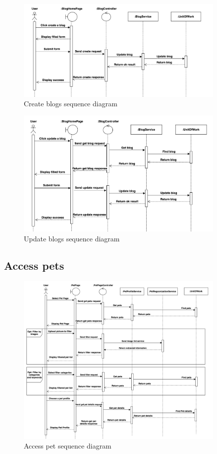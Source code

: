 \begin{figure}[H]
    \centering
    \includegraphics[width=0.9\textwidth]{Figures/manage_blog_seq.png}
    \caption{Create blogs sequence diagram}
    \label{fig:manage-blog-seq}
\end{figure}

\begin{figure}[H]
    \centering
    \includegraphics[width=0.9\textwidth]{Figures/update_blog_seq.png}
    \caption{Update blogs sequence diagram}
    \label{fig:update-blog-seq}
\end{figure}
\clearpage

\subsection*{Access pets}
\begin{figure}[H]
    \centering
    \includegraphics[width=0.9\textwidth]{Figures/access_pet_seq.png}
    \caption{Access pet sequence diagram}
    \label{fig:access-pet-seq}
\end{figure}

